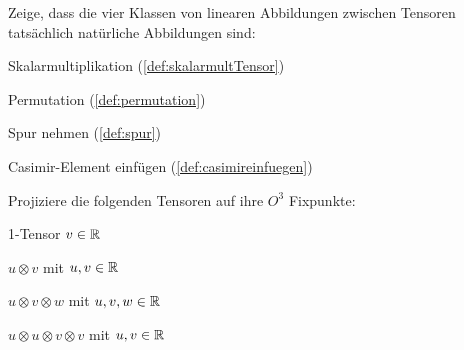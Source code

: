 \begin{problem}
	\label{aufg:natAbbKlass}
	Zeige, dass die vier Klassen von linearen Abbildungen zwischen Tensoren tatsächlich natürliche Abbildungen sind:
	\begin{subproblem}
		Skalarmultiplikation (\ref{def:skalarmultTensor})
	\end{subproblem}
	\begin{subproblem}
		Permutation (\ref{def:permutation})
	\end{subproblem}
	\begin{subproblem}
		Spur nehmen (\ref{def:spur})
	\end{subproblem}
	\begin{subproblem}
		Casimir-Element einfügen (\ref{def:casimireinfuegen})
	\end{subproblem}
\end{problem}

\begin{problem}
	\label{aufg:aufg:TensorfixProj}
	Projiziere die folgenden Tensoren auf ihre $O^3$ Fixpunkte:
	\begin{subproblem}
		1-Tensor $v\in\mathbb{R}$
	\end{subproblem}
	\begin{subproblem}
		$u\otimes v$ mit $u,v \in \mathbb{R}$
	\end{subproblem}
	\begin{subproblem}
		$u\otimes v \otimes w$ mit $u,v,w \in \mathbb{R}$	
	\end{subproblem}
	\begin{subproblem}
	$u\otimes u \otimes v \otimes v$ mit $u,v \in \mathbb{R}$
	\end{subproblem}
\end{problem}
